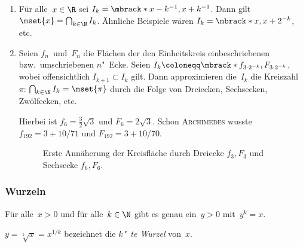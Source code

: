 \documentclass[a4paper]{article}
\begin{document}
\begin{example}\leavevmode
    \begin{enumerate}
        \item Für alle~$x \in \R$ sei $I_k = \mbrack*{x-k^{-1}, x+k^{-1}}$. Dann gilt $\mset{x} = \bigcap_{k\in\N} I_k$. Ähnliche Beispiele wären $I_k = \mbrack*{x, x+2^{-k}}$, etc.
        \item Seien $f_n$~und~$F_n$ die Flächen der den Einheitskreis einbeschriebenen bzw.\ umschriebenen $n$"~Ecke. Seien $I_k \coloneqq \mbrack*{f_{3\cdot2^{-k}}, F_{3\cdot2^{-k}}}$, wobei offensichtlich $I_{k+1} \subset I_k$ gilt. Dann approximieren die~$I_k$ die Kreiszahl~$\pi$: $\bigcap_{k\in\N} I_k = \mset{\pi}$ durch die Folge von Dreiecken, Sechsecken, Zwölfecken, etc.

              Hierbei ist $f_6 = \frac{3}{2} \sqrt{3}$ und $F_6 = 2 \sqrt{3}$. Schon \textsc{Archimedes} wusste $f_{192} = 3 + 10/71$ und $F_{192} = 3 + 10/70$.

              \begin{figure}
                  \caption{Erste Annäherung der Kreisfläche durch Dreiecke $f_3, F_3$ und Sechsecke $f_6, F_6$.}
              \end{figure}
    \end{enumerate}
\end{example}

\subsubsection{Wurzeln}

\begin{theorem}
    Für alle~$x > 0$ und für alle~$k \in \N$ gibt es genau ein~$y > 0$ mit~$y^k = x$.
\end{theorem}

\begin{notation}
    $y = \sqrt[k]{x} = x^{1/k}$ bezeichnet die \emph{$k$"~te Wurzel} von~$x$.
\end{notation}
\end{document}
